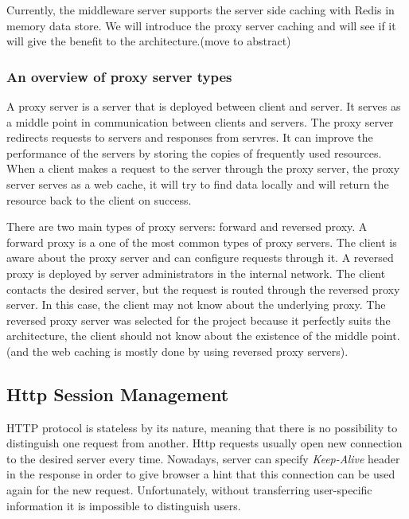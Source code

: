 Currently, the middleware server supports the server side caching with Redis in memory data store. We will introduce the proxy server caching and will see if it will give the benefit to the architecture.(move to abstract) 

\subsubsection{An overview of proxy server types}

A proxy server is a server that is deployed between client and server. It serves as a middle point in communication between clients and servers. The proxy server redirects requests to servers and responses from servres. It can improve the performance of the servers by storing the copies of frequently used resources. When a client makes a request to the server through the proxy server, the  proxy server serves as a web cache, it will try to find data locally and will return the resource back to the client on success.

There are two main types of proxy servers: forward and reversed proxy\cite{WWWCaching}.
A forward proxy is a one of the most common types of proxy servers. The client is aware about the proxy server and can configure requests through it.
A reversed proxy is deployed by server administrators in the internal network. The client contacts the desired server, but the request is routed through the reversed proxy server. In this case, the client may not know about the underlying proxy. 
The reversed proxy server was selected for the project because it perfectly suits the architecture, the client should not know about the existence of the middle point. (and the web caching is mostly done by using reversed proxy servers).


\subsection{Http Session Management}

HTTP protocol is stateless by its nature, meaning that there is no possibility to distinguish one request from another. Http requests usually open new connection to the desired server every time. Nowadays, server can specify \textit{Keep-Alive} header in the response in order to give browser a hint that this connection can be used again for the new request. Unfortunately, without transferring user-specific information it is impossible to distinguish users.  

